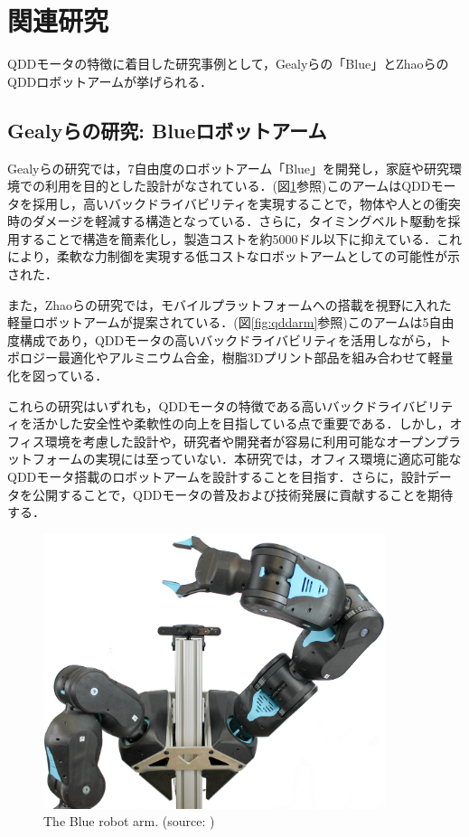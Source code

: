 
\section{関連研究}
QDDモータの特徴に着目した研究事例として，Gealyらの「Blue」とZhaoらのQDDロボットアームが挙げられる．\cite{gealy2019quasidirectdrivelowcostcompliant}\cite{10106520}
\subsection{Gealyらの研究: Blueロボットアーム}
Gealyらの研究では，7自由度のロボットアーム「Blue」を開発し，家庭や研究環境での利用を目的とした設計がなされている．(図\ref{fig:blue}参照)このアームはQDDモータを採用し，高いバックドライバビリティを実現することで，物体や人との衝突時のダメージを軽減する構造となっている．さらに，タイミングベルト駆動を採用することで構造を簡素化し，製造コストを約5000ドル以下に抑えている．これにより，柔軟な力制御を実現する低コストなロボットアームとしての可能性が示された．

また，Zhaoらの研究では，モバイルプラットフォームへの搭載を視野に入れた軽量ロボットアームが提案されている．(図\ref{fig:qddarm}参照)このアームは5自由度構成であり，QDDモータの高いバックドライバビリティを活用しながら，トポロジー最適化やアルミニウム合金，樹脂3Dプリント部品を組み合わせて軽量化を図っている．

これらの研究はいずれも，QDDモータの特徴である高いバックドライバビリティを活かした安全性や柔軟性の向上を目指している点で重要である．しかし，オフィス環境を考慮した設計や，研究者や開発者が容易に利用可能なオープンプラットフォームの実現には至っていない．本研究では，オフィス環境に適応可能なQDDモータ搭載のロボットアームを設計することを目指す．さらに，設計データを公開することで，QDDモータの普及および技術発展に貢献することを期待する．

\begin{figure}[h]
  \centering
  \includegraphics[width=10cm]{images/twoArmTeaser.jpg}
  \caption{The Blue robot arm. (source: \cite{gealy2019quasidirectdrivelowcostcompliant})}
  \label{fig:blue}
\end{figure}

